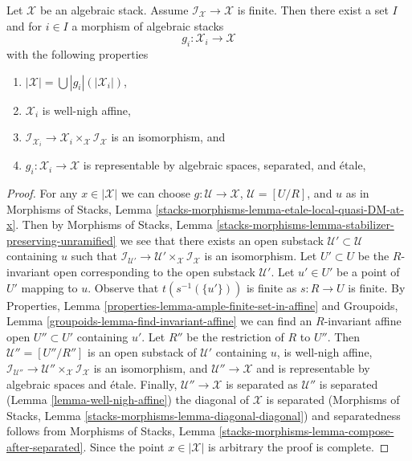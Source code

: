 \begin{lemma}
\label{lemma-etale-local-finite-inertia}
Let $\mathcal{X}$ be an algebraic stack. Assume
$\mathcal{I}_\mathcal{X} \to \mathcal{X}$ is finite.
Then there exist a set $I$ and for $i \in I$ a morphism of algebraic stacks
$$
g_i : \mathcal{X}_i \longrightarrow \mathcal{X}
$$
with the following properties
\begin{enumerate}
\item $|\mathcal{X}| = \bigcup |g_i|(|\mathcal{X}_i|)$,
\item $\mathcal{X}_i$ is well-nigh affine,
\item $\mathcal{I}_{\mathcal{X}_i} \to
\mathcal{X}_i \times_\mathcal{X} \mathcal{I}_\mathcal{X}$
is an isomorphism, and
\item $g_i : \mathcal{X}_i \to \mathcal{X}$ is representable
by algebraic spaces, separated, and \'etale,
\end{enumerate}
\end{lemma}

\begin{proof}
For any $x \in |\mathcal{X}|$ we can choose
$g : \mathcal{U} \to \mathcal{X}$, $\mathcal{U} = [U/R]$, and $u$ as in
Morphisms of Stacks,
Lemma \ref{stacks-morphisms-lemma-etale-local-quasi-DM-at-x}.
Then by
Morphisms of Stacks, Lemma
\ref{stacks-morphisms-lemma-stabilizer-preserving-unramified}
we see that there exists an open substack
$\mathcal{U}' \subset \mathcal{U}$ containing $u$
such that $\mathcal{I}_{\mathcal{U}'} \to
\mathcal{U}' \times_\mathcal{X} \mathcal{I}_\mathcal{X}$
is an isomorphism.
Let $U' \subset U$ be the $R$-invariant open corresponding to
the open substack $\mathcal{U}'$.
Let $u' \in U'$ be a point of $U'$ mapping to $u$.
Observe that $t(s^{-1}(\{u'\}))$ is finite as $s : R \to U$ is finite.
By Properties, Lemma \ref{properties-lemma-ample-finite-set-in-affine}
and Groupoids, Lemma \ref{groupoids-lemma-find-invariant-affine}
we can find an $R$-invariant affine open $U'' \subset U'$
containing $u'$. Let $R''$ be the restriction of $R$ to $U''$.
Then $\mathcal{U}'' = [U''/R'']$ is an open substack of
$\mathcal{U}'$ containing $u$, is well-nigh affine,
$\mathcal{I}_{\mathcal{U}''} \to
\mathcal{U}'' \times_\mathcal{X} \mathcal{I}_\mathcal{X}$
is an isomorphism, and $\mathcal{U}'' \to \mathcal{X}$
and is representable by algebraic spaces and \'etale.
Finally, $\mathcal{U}'' \to \mathcal{X}$ is separated as
$\mathcal{U}''$ is separated (Lemma \ref{lemma-well-nigh-affine})
the diagonal of $\mathcal{X}$ is separated
(Morphisms of Stacks, Lemma \ref{stacks-morphisms-lemma-diagonal-diagonal})
and separatedness follows from Morphisms of Stacks, Lemma
\ref{stacks-morphisms-lemma-compose-after-separated}.
Since the point $x \in |\mathcal{X}|$ is arbitrary the proof is complete.
\end{proof}
